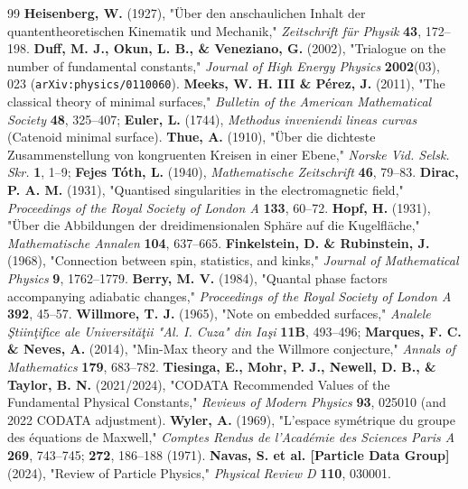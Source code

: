 \documentclass[10pt,a4paper]{article}
\begin{document}
\begin{thebibliography}{99}
 \textbf{Heisenberg, W.} (1927), "Über den anschaulichen Inhalt der quantentheoretischen Kinematik und Mechanik," \textit{Zeitschrift für Physik} \textbf{43}, 172–198.
 \textbf{Duff, M. J., Okun, L. B., \& Veneziano, G.} (2002), "Trialogue on the number of fundamental constants," \textit{Journal of High Energy Physics} \textbf{2002}(03), 023 (\texttt{arXiv:physics/0110060}).
 \textbf{Meeks, W. H. III \& Pérez, J.} (2011), "The classical theory of minimal surfaces," \textit{Bulletin of the American Mathematical Society} \textbf{48}, 325–407; \textbf{Euler, L.} (1744), \textit{Methodus inveniendi lineas curvas} (Catenoid minimal surface).
 \textbf{Thue, A.} (1910), "Über die dichteste Zusammenstellung von kongruenten Kreisen in einer Ebene," \textit{Norske Vid. Selsk. Skr.} \textbf{1}, 1–9; \textbf{Fejes Tóth, L.} (1940), \textit{Mathematische Zeitschrift} \textbf{46}, 79–83.
 \textbf{Dirac, P. A. M.} (1931), "Quantised singularities in the electromagnetic field," \textit{Proceedings of the Royal Society of London A} \textbf{133}, 60–72.
 \textbf{Hopf, H.} (1931), "Über die Abbildungen der dreidimensionalen Sphäre auf die Kugelfläche," \textit{Mathematische Annalen} \textbf{104}, 637–665.
 \textbf{Finkelstein, D. \& Rubinstein, J.} (1968), "Connection between spin, statistics, and kinks," \textit{Journal of Mathematical Physics} \textbf{9}, 1762–1779.
 \textbf{Berry, M. V.} (1984), "Quantal phase factors accompanying adiabatic changes," \textit{Proceedings of the Royal Society of London A} \textbf{392}, 45–57.
 \textbf{Willmore, T. J.} (1965), "Note on embedded surfaces," \textit{Analele Ştiinţifice ale Universităţii "Al. I. Cuza" din Iaşi} \textbf{11B}, 493–496; \textbf{Marques, F. C. \& Neves, A.} (2014), "Min-Max theory and the Willmore conjecture," \textit{Annals of Mathematics} \textbf{179}, 683–782.
 \textbf{Tiesinga, E., Mohr, P. J., Newell, D. B., \& Taylor, B. N.} (2021/2024), "CODATA Recommended Values of the Fundamental Physical Constants," \textit{Reviews of Modern Physics} \textbf{93}, 025010 (and 2022 CODATA adjustment).
 \textbf{Wyler, A.} (1969), "L'espace symétrique du groupe des équations de Maxwell," \textit{Comptes Rendus de l'Académie des Sciences Paris A} \textbf{269}, 743–745; \textbf{272}, 186–188 (1971).
 \textbf{Navas, S. et al. [Particle Data Group]} (2024), "Review of Particle Physics," \textit{Physical Review D} \textbf{110}, 030001.

\end{thebibliography}
\end{document}
